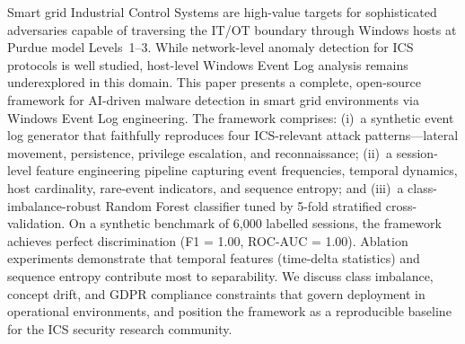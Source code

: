 Smart grid Industrial Control Systems are high-value targets for sophisticated adversaries
capable of traversing the IT/OT boundary through Windows hosts at Purdue model Levels~1--3.
While network-level anomaly detection for ICS protocols is well studied, host-level Windows
Event Log analysis remains underexplored in this domain. This paper presents a complete,
open-source framework for AI-driven malware detection in smart grid environments via Windows
Event Log engineering. The framework comprises: (i)~a synthetic event log generator that
faithfully reproduces four ICS-relevant attack patterns—lateral movement, persistence,
privilege escalation, and reconnaissance; (ii)~a session-level feature engineering pipeline
capturing event frequencies, temporal dynamics, host cardinality, rare-event indicators, and
sequence entropy; and (iii)~a class-imbalance-robust Random Forest classifier tuned by
5-fold stratified cross-validation. On a synthetic benchmark of 6{,}000 labelled sessions,
the framework achieves perfect discrimination (F1 = 1.00, ROC-AUC = 1.00). Ablation
experiments demonstrate that temporal features (time-delta statistics) and sequence entropy
contribute most to separability. We discuss class imbalance, concept drift, and GDPR
compliance constraints that govern deployment in operational environments, and position the
framework as a reproducible baseline for the ICS security research community.
